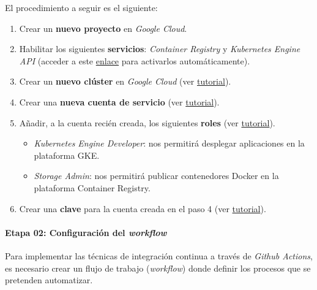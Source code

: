 El procedimiento a seguir es el siguiente:

\begin{enumerate}
\def\labelenumi{\arabic{enumi}.}
\tightlist
\item
  Crear un \textbf{nuevo proyecto} en \emph{Google Cloud}.
\item
  Habilitar los siguientes \textbf{servicios}: \emph{Container Registry}
  y \emph{Kubernetes Engine API} (acceder a este
  \href{https://console.cloud.google.com/flows/enableapi?apiid=containerregistry.googleapis.com,container.googleapis.com}{enlace}
  para activarlos automáticamente).
\item
  Crear un \textbf{nuevo clúster} en \emph{Google Cloud} (ver
  \href{https://cloud.google.com/kubernetes-engine/docs/quickstart\#create_cluster}{tutorial}).
\item
  Crear una \textbf{nueva cuenta de servicio} (ver
  \href{https://cloud.google.com/iam/docs/creating-managing-service-accounts}{tutorial}).
\item
  Añadir, a la cuenta recién creada, los siguientes \textbf{roles} (ver
  \href{https://cloud.google.com/iam/docs/granting-roles-to-service-accounts\#granting_access_to_a_service_account_for_a_resource}{tutorial}).

  \begin{itemize}
  \tightlist
  \item
    \emph{Kubernetes Engine Developer}: nos permitirá desplegar
    aplicaciones en la plataforma GKE.
  \item
    \emph{Storage Admin}: nos permitirá publicar contenedores Docker en
    la plataforma Container Registry.
  \end{itemize}
\item
  Crear una \textbf{clave} para la cuenta creada en el paso 4 (ver
  \href{https://cloud.google.com/iam/docs/creating-managing-service-account-keys}{tutorial}).
\end{enumerate}


\paragraph{Etapa 02: Configuración del \emph{workflow}}

Para implementar las técnicas de integración continua a través de
\emph{Github Actions}, es necesario crear un flujo de trabajo
(\emph{workflow}) donde definir los procesos que se pretenden
automatizar.

